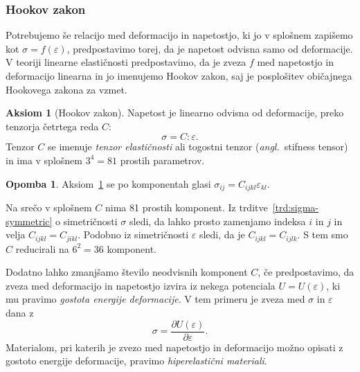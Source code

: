 \documentclass[12pt,a4paper,twoside]{article}
\theoremstyle{definition} %
\newtheorem{opomba}[definicija]{Opomba}
\newtheorem{aksiom}{Aksiom}
\theoremstyle{plain} %
\numberwithin{equation}{section}
\newcommand{\eps}{\varepsilon}
\newcommand{\dpar}[2]{\ensuremath{\frac{\partial #1}{\partial #2}}}
\newcommand{\ts}{\sigma}
\newcommand{\ang}[1]{(\hspace{-1.5px}\textit{angl.}\ #1)}
\begin{document}
\subsubsection{Hookov zakon}
Potrebujemo še relacijo med deformacijo in napetostjo, ki jo v splošnem zapišemo kot $\ts =
f(\eps)$, predpostavimo torej, da je napetost odvisna samo od deformacije. V teoriji linearne
elastičnosti predpostavimo, da je zveza $f$ med napetostjo in deformacijo linearna in jo imenujemo
Hookov zakon, saj je posplošitev običajnega Hookovega zakona za vzmet.
\begin{aksiom}[Hookov zakon]
  \label{aks:hook}
  Napetost je linearno odvisna od deformacije, preko tenzorja četrtega reda $C$:
  \begin{equation}
    \label{eq:hooke}
    \ts = C:\eps.
  \end{equation}
  Tenzor $C$ se imenuje \emph{tenzor elastičnosti} ali togostni tenzor
  \ang{stifness tensor} in ima v splošnem $3^4 = 81$ prostih parametrov.
\end{aksiom}
\begin{opomba}
  Aksiom~\ref{aks:hook} se po komponentah glasi $\ts_{ij} = C_{ijkl}
  \eps_{kl}$.
\end{opomba}
Na srečo v splošnem $C$ nima 81 prostih komponent.
Iz trditve~\ref{trd:sigma-symmetric} o simetričnosti $\ts$ sledi, da lahko
prosto zamenjamo indeksa $i$ in $j$ in velja $C_{ijkl} = C_{jikl}$.
Podobno iz simetričnosti $\eps$ sledi, da je $C_{ijkl} = C_{ijlk}$.
S tem smo $C$ reducirali na $6^2 = 36$ komponent.

Dodatno lahko zmanjšamo število neodvisnih komponent $C$, če predpostavimo, da zveza med deformacijo
in napetostjo izvira iz nekega potenciala $U = U(\eps)$, ki mu pravimo \emph{gostota energije
deformacije}. V tem primeru je zveza med $\ts$ in $\eps$ dana z
\begin{equation}
   \ts = \dpar{U(\eps)}{\eps}.
\end{equation}
Materialom, pri katerih je zvezo med napetostjo in deformacijo možno opisati z gostoto energije
deformacije, pravimo \emph{hiperelastični materiali}.
\end{document}
